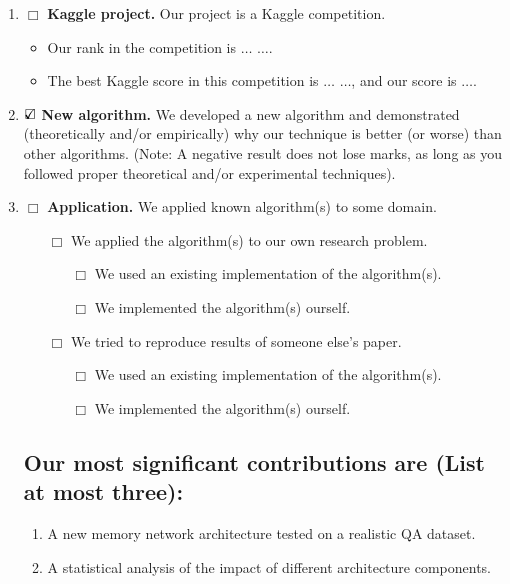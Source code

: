 \documentclass[10pt]{article}
\begin{document}
\begin{enumerate}

\item $\Box$ \textbf{Kaggle project.} Our project is a Kaggle competition.
\begin{itemize} \item Our rank in the competition is $\dots$ $\dots$. 
\item  The best Kaggle score in this competition is $\dots$ $\dots$, and our score is $\dots$.
\end{itemize}

 \item $\mbox{\ooalign{$\checkmark$\cr\hidewidth$\square$\hidewidth\cr}} $  \textbf{New algorithm.}  We developed a new algorithm and demonstrated (theoretically and/or empirically) why our technique
is better (or worse) than other algorithms. (Note: A negative result
does not lose marks, as long as  you followed proper theoretical
and/or experimental techniques). \item $\Box$ \textbf{Application.}
We applied known algorithm(s) to some domain.
\begin{itemize}
\item [$\Box$] We applied the algorithm(s) to our own research
problem.
\begin{itemize}
\item [$\Box$] We used an existing implementation of the
algorithm(s).  \item [$\Box$] We implemented the algorithm(s)
ourself.
\end{itemize}
 \item [$\Box$] We tried to reproduce results of someone
else's paper.
\begin{itemize}
\item [$\Box$] We used an existing implementation of the
algorithm(s).  \item [$\Box$] We implemented the algorithm(s)
ourself.
\end{itemize}
\end{itemize} 
\subsection*{Our most significant contributions are (List at most three):}
\begin{enumerate}
\item A new memory network architecture tested on a realistic QA dataset.
\item A statistical analysis of the impact of different architecture components. 

\end{enumerate}

\end{enumerate}
\end{document}
